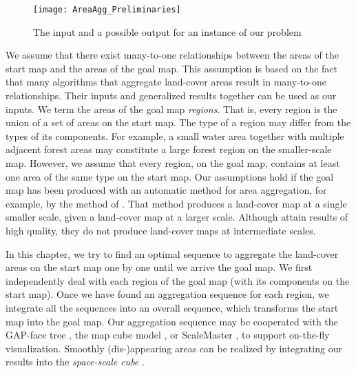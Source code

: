 \begin{figure}[tb]
\centering
\texttt{[image: AreaAgg\_Preliminaries]}
\caption{The input and a possible output for an instance of 
our problem}
\label{fig:AreaAgg_example}
\end{figure}

We assume that there exist many-to-one relationships between the 
areas of the
start map and the areas of the goal map.
This assumption is based on the fact that many algorithms 
\parencite[e.g.,][]{HaunertWolff2010AreaAgg,
vanSmaalen2003,Oehrlein2017Aggregation}
that aggregate land-cover areas
result in many-to-one relationships.
Their inputs and generalized results together
can be used as our inputs.
We term the areas of the goal map \emph{regions}.
That is, every region is the union of a set of areas 
on the start map.
The type of a region may differ from the types of its 
components. 
For example, a small water area together with 
multiple adjacent forest areas may constitute 
a large forest region on the smaller-scale map.
However, we assume that every region, on the goal map, 
contains at least one area of the same type on the start map.
Our assumptions hold if the goal map has been produced 
with an automatic method for area aggregation, 
for example, by the method of \citet{HaunertWolff2010AreaAgg}.
That method produces a land-cover map at a single smaller scale, 
given a land-cover map at a larger scale.
Although \textcite{HaunertWolff2010AreaAgg}
attain results of high quality, 
they do not produce land-cover maps at intermediate scales.

In this chapter, we try to find an optimal sequence
to aggregate the land-cover areas on the start map
one by one until we arrive the goal map.
We first independently deal with each region of the goal map 
(with its components on the start map).
Once we have found an aggregation sequence for each region, 
we integrate all the sequences into an overall sequence,
which transforms the start map into the goal map. 
Our aggregation sequence may be cooperated with
the GAP-face tree \citep{vanOosterom2005},
the map cube model \citep{Timpf1998},
or ScaleMaster \citep{Brewer2007Guidelines,Touya2013ScaleMaster}, 
to support on-the-fly visualization.
Smoothly (dis-)appearing areas can be realized
by integrating our results into the \emph{space-scale cube}
\parencite{vanOosterom2014tGAP,vanOosterom2014tGAPSSC}.


